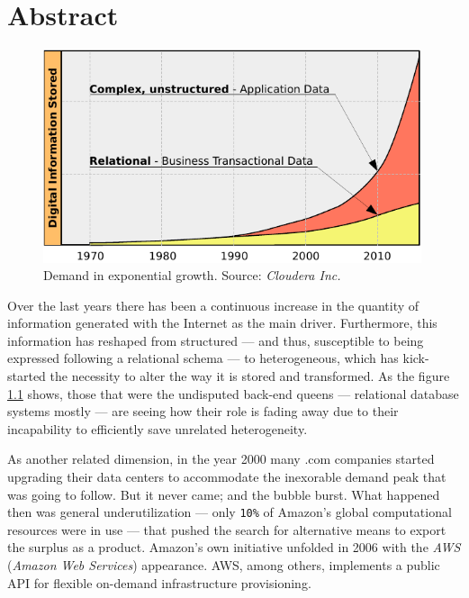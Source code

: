 \chapter{Abstract}\label{cap:intro}

\begin{figure}[tbp]
\begin{center}
\includegraphics[width=0.99\textwidth]{imagenes/001.pdf}
 \caption{Demand in exponential growth. Source: \emph{Cloudera Inc.}}
\label{fig:datagraph}
\end{center}
\end{figure}

\noindent Over the last years there has been a continuous increase in the quantity of information generated with the Internet as the main driver. Furthermore, this information has reshaped from structured --- and thus, susceptible to being expressed following a relational schema --- to heterogeneous, which has kick-started the necessity to alter the way it is stored and transformed. As the figure \ref{fig:datagraph} shows, those that were the undisputed back-end queens --- relational database systems mostly --- are seeing how their role is fading away due to their incapability to efficiently save unrelated heterogeneity.

As another related dimension, in the year 2000 many .com companies started upgrading their data centers to accommodate the inexorable demand peak that was going to follow. But it never came; and the bubble burst. What happened then was general underutilization --- only \texttt{10\%} of Amazon's global computational resources were in use --- that pushed the search for alternative means to export the surplus as a product. Amazon's own initiative unfolded in 2006 with the \emph{AWS} (\emph{Amazon Web Services}) appearance. AWS, among others, implements a public API for flexible on-demand infrastructure provisioning.

